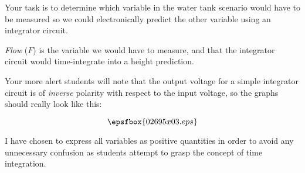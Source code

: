 Your task is to determine which variable in the water tank scenario would have to be measured so we could electronically predict the other variable using an integrator circuit.







{\it Flow} ($F$) is the variable we would have to measure, and that the integrator circuit would time-integrate into a height prediction.







Your more alert students will note that the output voltage for a simple integrator circuit is of {\it inverse} polarity with respect to the input voltage, so the graphs should really look like this:

$$\epsfbox{02695x03.eps}$$

I have chosen to express all variables as positive quantities in order to avoid any unnecessary confusion as students attempt to grasp the concept of time integration.




